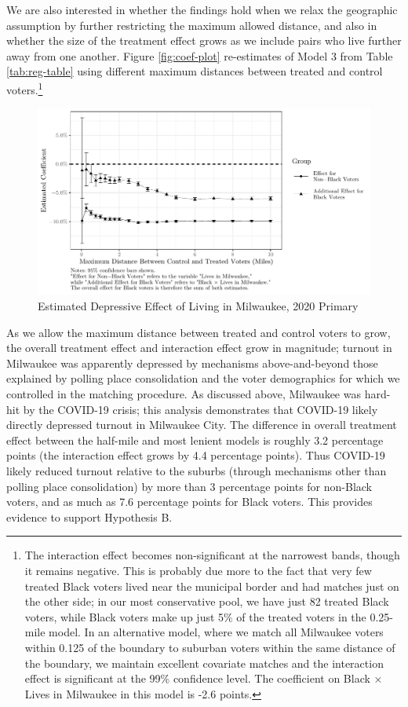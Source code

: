 \documentclass[
  12pt,
]{article}
\begin{document}
We are also interested in whether the findings hold when we relax the geographic assumption by further restricting the maximum allowed distance, and also in whether the size of the treatment effect grows as we include pairs who live further away from one another. Figure \ref{fig:coef-plot} re-estimates of Model 3 from Table \ref{tab:reg-table} using different maximum distances between treated and control voters.\footnote{The interaction effect becomes non-significant at the narrowest bands, though it remains negative. This is probably due more to the fact that very few treated Black voters lived near the municipal border and had matches just on the other side; in our most conservative pool, we have just 82 treated Black voters, while Black voters make up just 5\% of the treated voters in the 0.25-mile model. In an alternative model, where we match all Milwaukee voters within 0.125 of the boundary to suburban voters within the same distance of the boundary, we maintain excellent covariate matches and the interaction effect is significant at the 99\% confidence level. The coefficient on Black × Lives in Milwaukee in this model is -2.6 points.}

\begin{figure}[H]

{\centering \includegraphics{mke_turnout_files/figure-latex/plot-1} 

}

\caption{\label{fig:coef-plot}Estimated Depressive Effect of Living in Milwaukee, 2020 Primary}\label{fig:plot}
\end{figure}

As we allow the maximum distance between treated and control voters to grow, the overall treatment effect and interaction effect grow in magnitude; turnout in Milwaukee was apparently depressed by mechanisms above-and-beyond those explained by polling place consolidation and the voter demographics for which we controlled in the matching procedure. As discussed above, Milwaukee was hard-hit by the COVID-19 crisis; this analysis demonstrates that COVID-19 likely directly depressed turnout in Milwaukee City. The difference in overall treatment effect between the half-mile and most lenient models is roughly 3.2 percentage points (the interaction effect grows by 4.4 percentage points). Thus COVID-19 likely reduced turnout relative to the suburbs (through mechanisms other than polling place consolidation) by more than 3 percentage points for non-Black voters, and as much as 7.6 percentage points for Black voters. This provides evidence to support Hypothesis B.
\end{document}
